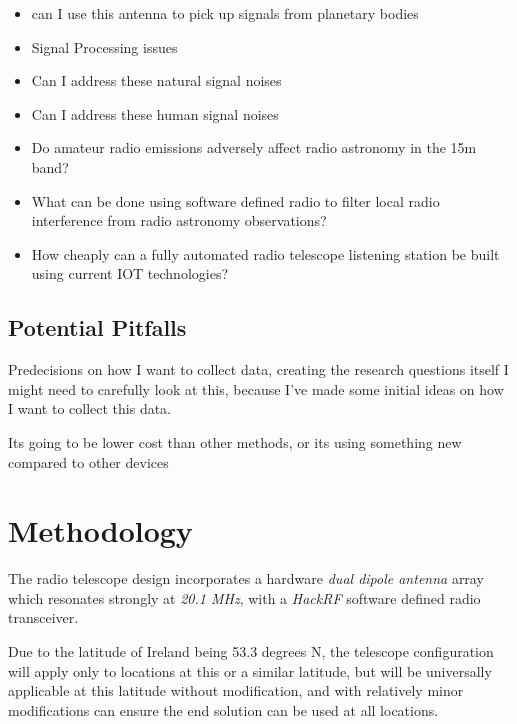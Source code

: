 \documentclass[runningheads,a4paper]{llncs}
\begin{document}
\begin{itemize}
  \item can I use this antenna to pick up signals from planetary bodies
  \item Signal Processing issues
  \item Can I address these natural signal noises
  \item Can I address these human signal noises
\end{itemize}

\begin{itemize}
  \item Do amateur radio emissions adversely affect radio astronomy in the 15m band?
  \item What can be done using software defined radio to filter local radio interference from radio astronomy observations?
  \item How cheaply can a fully automated radio telescope listening station be built using current IOT technologies?
\end{itemize}

%
%
\subsection*{Potential Pitfalls}
Predecisions on how I want to collect data, creating the research questions itself I might need to carefully look at this, because I've made some initial ideas on how I want to collect this data.

Its going to be lower cost than other methods, or its using something new compared to other devices


%
%
\newpage
\section*{Methodology}

The radio telescope design incorporates a hardware \textit{dual dipole antenna} array which resonates strongly at \textit{20.1 MHz}, with a \textit{HackRF} software defined radio transceiver. 

Due to the latitude of Ireland being 53.3 degrees N, the telescope configuration will apply only to locations at this or a similar latitude, but will be universally applicable at this latitude without modification, and with relatively minor modifications can ensure the end solution can be used at all locations. \cite{kivelson96}
\end{document}
